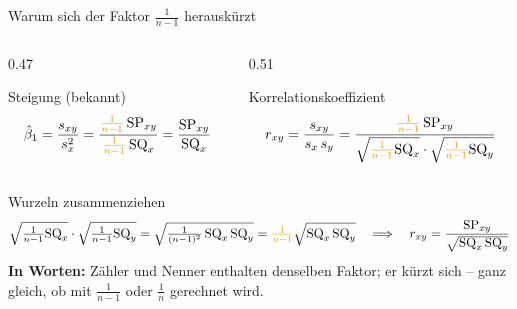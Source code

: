 \documentclass[aspectratio=169,11pt]{beamer}
\newcommand{\SQx}{\text{SQ}_x}
\newcommand{\SQy}{\text{SQ}_y}
\newcommand{\SPxy}{\text{SP}_{xy}}
\begin{document}
\begin{frame}{Warum sich der Faktor $\frac{1}{n-1}$ herauskürzt}
  \begin{columns}[T]
    \begin{column}{0.47\textwidth}
      \begin{block}{Steigung (bekannt)}
        \vspace{-2pt}
        \[
          \hat{\beta}_1 = \frac{s_{xy}}{s_x^{2}}
          = \frac{{\color{hsbiaccent}\frac{1}{n-1}}\,\SPxy}{{\color{hsbiaccent}\frac{1}{n-1}}\,\SQx}
          = \frac{\SPxy}{\SQx}
        \]
      \end{block}
    \end{column}
    \begin{column}{0.51\textwidth}
      \begin{block}{Korrelationskoeffizient}
        \vspace{-2pt}
        \[
          r_{xy} = \frac{s_{xy}}{s_x\,s_y}
          = \frac{{\color{hsbiaccent}\frac{1}{n-1}}\,\SPxy}
                 {\sqrt{{\color{hsbiaccent}\frac{1}{n-1}}\SQx}\cdot\sqrt{{\color{hsbiaccent}\frac{1}{n-1}}\SQy}}
        \]
      \end{block}
    \end{column}
  \end{columns}

  \begin{block}{Wurzeln zusammenziehen}
    \vspace{-6pt}
    \[
      \sqrt{\tfrac{1}{n-1}\SQx}\cdot\sqrt{\tfrac{1}{n-1}\SQy}
      = \sqrt{\tfrac{1}{(n-1)^{2}}\,\SQx\,\SQy}
      = {\color{hsbiaccent}\tfrac{1}{n-1}}\sqrt{\SQx\,\SQy}
      \quad\Longrightarrow\quad
      r_{xy} = \frac{\SPxy}{\sqrt{\SQx\,\SQy}}
    \]
    \textbf{In Worten:} Zähler und Nenner enthalten denselben Faktor; er kürzt
    sich -- ganz gleich, ob mit $\frac{1}{n-1}$ oder $\frac{1}{n}$ gerechnet wird.
  \end{block}
\end{frame}
\end{document}
